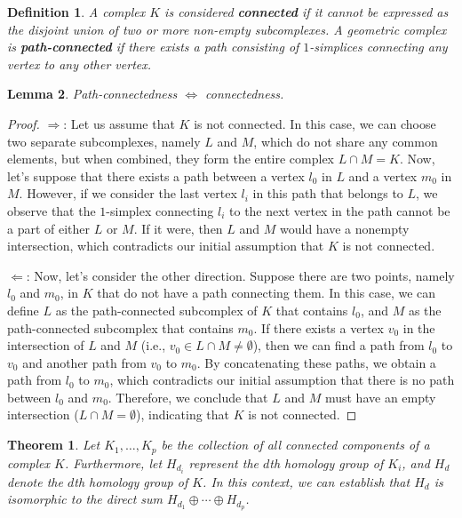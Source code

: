 \documentclass{amsart}
\newtheorem{theorem}[section]{Theorem}
\newtheorem{definition}{Definition}[section]
\newtheorem{lemma}[definition]{Lemma}
\begin{document}
\begin{definition}
A complex $K$ is considered \textbf{connected} if it cannot be expressed as the disjoint union of two or more non-empty subcomplexes. A geometric complex is \textbf{path-connected} if there exists a path consisting of $1$-simplices connecting any vertex to any other vertex.
\end{definition}

\begin{lemma}
\label{pathconnect}
Path-connectedness $\Longleftrightarrow$ connectedness.
\end{lemma}

\begin{proof}
\glqq $\Longrightarrow$\grqq{}: Let us assume that $K$ is not connected. In this case, we can choose two separate subcomplexes, namely $L$ and $M$, which do not share any common elements, but when combined, they form the entire complex $L \cap M = K$. Now, let's suppose that there exists a path between a vertex $l_0$ in $L$ and a vertex $m_0$ in $M$. However, if we consider the last vertex $l_i$ in this path that belongs to $L$, we observe that the $1$-simplex connecting $l_i$ to the next vertex in the path cannot be a part of either $L$ or $M$. If it were, then $L$ and $M$ would have a nonempty intersection, which contradicts our initial assumption that $K$ is not connected.

\glqq $\Longleftarrow$\grqq{}: Now, let's consider the other direction. Suppose there are two points, namely $l_0$ and $m_0$, in $K$ that do not have a path connecting them. In this case, we can define $L$ as the path-connected subcomplex of $K$ that contains $l_0$, and $M$ as the path-connected subcomplex that contains $m_0$. If there exists a vertex $v_0$ in the intersection of $L$ and $M$ (i.e., $v_0 \in L \cap M \neq \emptyset$), then we can find a path from $l_0$ to $v_0$ and another path from $v_0$ to $m_0$. By concatenating these paths, we obtain a path from $l_0$ to $m_0$, which contradicts our initial assumption that there is no path between $l_0$ and $m_0$. Therefore, we conclude that $L$ and $M$ must have an empty intersection ($L\cap M= \emptyset$), indicating that $K$ is not connected.
\end{proof}

\begin{theorem}
\label{decomptheorem}
Let $K_1, \ldots, K_p$ be the collection of all connected components of a complex $K$. Furthermore, let $H_{d_i}$ represent the $d$th homology group of $K_i$, and $H_d$ denote the $d$th homology group of $K$. In this context, we can establish that $H_d$ is isomorphic to the direct sum $H_{d_1} \oplus \cdots \oplus H_{d_p}$.
\end{theorem}
\end{document}
